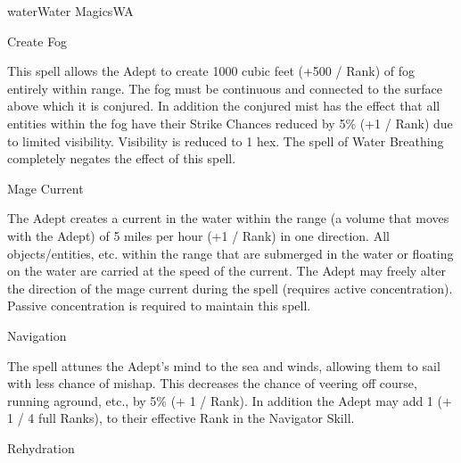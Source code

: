 \begin{College}[1.3]{water}{Water Magics}{WA}
\begin{spell}[G-3]{Create Fog}
\begin{effects}
This spell allows the Adept to create 1000 cubic feet (+500 / Rank) of
fog entirely within range.  The fog must be continuous and connected
to the surface above which it is conjured.  In addition the conjured
mist has the effect that all entities within the fog have their Strike
Chances reduced by 5\% (+1 / Rank) due to limited visibility.
Visibility is reduced to 1 hex.  The spell of Water Breathing
completely negates the effect of this spell.
\end{effects}
\end{spell}

\begin{spell}[G-4]{Mage Current}
\begin{effects}
The Adept creates a current in the water within the range (a volume
that moves with the Adept) of 5 miles per hour (+1 / Rank) in one
direction. All objects/entities, etc. within the range that are
submerged in the water or floating on the water are carried at the
speed of the current.  The Adept may freely alter the direction of the
mage current during the spell (requires active concentration). Passive
concentration is required to maintain this spell.
\end{effects}
\end{spell}

\begin{spell}[G-5]{Navigation}

\begin{effects}
The spell attunes the Adept’s mind to the sea and winds, allowing them
to sail with less chance of mishap.  This decreases the chance of
veering off course, running aground, etc., by 5\% (+ 1 / Rank). In
addition the Adept may add 1 (+ 1 / 4 full Ranks), to their effective
Rank in the Navigator Skill.
\end{effects}
\end{spell}

\begin{spell}[G-6]{Rehydration}


\end{spell}
\end{College}
